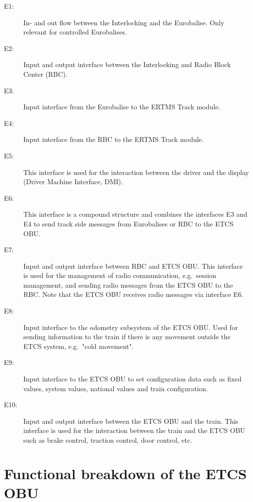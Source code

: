 \begin{description}
\item[E1:] In- and out flow between the Interlocking and the Eurobalise. Only relevant for controlled Eurobalises.

\item[E2:] Input and output interface between the Interlocking and Radio Block Center (RBC).

\item[E3:] Input interface from the Eurobalise to the ERTMS Track module.

\item[E4:] Input interface from the RBC to the ERTMS Track module.

\item[E5:] This interface is used for the interaction between the driver and the display (Driver Machine Interface, DMI).

\item[E6:] This interface is a compound structure and combines the interfaces E3 and E4 to send track side messages from Eurobalises or RBC to the ETCS OBU.

\item[E7:] Input and output interface between RBC and ETCS OBU. This interface is used for the management of radio communication, e.g.~session management, and sending radio messages from the ETCS OBU to the RBC. Note that the ETCS OBU receives radio messages via interface E6.

\item[E8:] Input interface to the odometry subsystem of the ETCS OBU. Used for sending information to the train if there is any movement outside the ETCS system, e.g.~"cold movement".

\item[E9:] Input interface to the ETCS OBU to set configuration data such as fixed values, system values, national values and train configuration.

\item[E10:] Input and output interface between the ETCS OBU and the train. This interface is used for the interaction between the train and the ETCS OBU such as brake control, traction control, door control, etc.
\end{description}


\section{Functional breakdown of the ETCS OBU}

